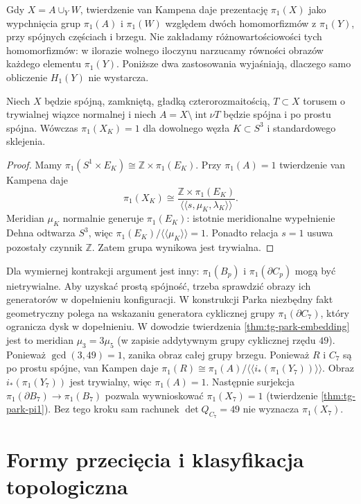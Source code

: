 Gdy $X=A\cup_Y W$, twierdzenie van Kampena daje prezentację
$\pi_1(X)$ jako wypchnięcia grup $\pi_1(A)$ i
$\pi_1(W)$ względem dwóch homomorfizmów
z $\pi_1(Y)$, przy spójnych częściach i brzegu.
Nie zakładamy różnowartościowości tych homomorfizmów:
w ilorazie wolnego iloczynu narzucamy równości
obrazów każdego elementu $\pi_1(Y)$. Poniższe dwa zastosowania
wyjaśniają, dlaczego samo obliczenie $H_1(Y)$ nie wystarcza.

\begin{stwierdzenie}
\label{prop:tg-syn-pi1}
Niech $X$ będzie spójną, zamkniętą, gładką czterorozmaitością,
$T\subset X$ torusem o trywialnej wiązce normalnej i niech
$A=X\setminus\operatorname{int}\nu T$ będzie spójna i po prostu
spójna. Wówczas $\pi_1(X_K)=1$ dla dowolnego węzła
$K\subset S^3$ i standardowego sklejenia.
\end{stwierdzenie}

\begin{proof}
Mamy $\pi_1(S^1\times E_K)\cong\mathbb Z\times\pi_1(E_K)$.
Przy $\pi_1(A)=1$ twierdzenie van Kampena daje
\[
 \pi_1(X_K)\cong
 \frac{\mathbb Z\times\pi_1(E_K)}
 {\langle\!\langle s,\mu_K,\lambda_K\rangle\!\rangle}.
\]
Meridian $\mu_K$ normalnie generuje $\pi_1(E_K)$: istotnie
meridionalne wypełnienie Dehna odtwarza $S^3$, więc
$\pi_1(E_K)/\langle\!\langle\mu_K\rangle\!\rangle=1$.
Ponadto relacja $s=1$ usuwa pozostały czynnik $\mathbb Z$.
Zatem grupa wynikowa jest trywialna.
\end{proof}

Dla wymiernej kontrakcji argument jest inny:
$\pi_1(B_p)$ i $\pi_1(\partial C_p)$ mogą być nietrywialne.
Aby uzyskać prostą spójność, trzeba sprawdzić obrazy ich
generatorów w dopełnieniu konfiguracji. W konstrukcji Parka
niezbędny fakt geometryczny polega na wskazaniu
generatora cyklicznej grupy $\pi_1(\partial C_7)$,
który ogranicza dysk w dopełnieniu.
W dowodzie twierdzenia \ref{thm:tg-park-embedding}
jest to meridian $\mu_3=3\mu_5$ (w zapisie
addytywnym grupy cyklicznej rzędu $49$).
Ponieważ $\gcd(3,49)=1$, zanika obraz całej grupy
brzegu. Ponieważ $R$ i $C_7$ są po prostu spójne,
van Kampen daje $\pi_1(R)\cong
\pi_1(A)/\langle\!\langle i_*(\pi_1(Y_7))\rangle\!\rangle$.
Obraz $i_*(\pi_1(Y_7))$ jest trywialny, więc
$\pi_1(A)=1$. Następnie surjekcja
$\pi_1(\partial B_7)\to\pi_1(B_7)$ pozwala
wywnioskować $\pi_1(X_7)=1$ (twierdzenie
\ref{thm:tg-park-pi1}). Bez tego
kroku sam rachunek $\det Q_{C_7}=49$ nie wyznacza
$\pi_1(X_7)$.

\section{Formy przecięcia i klasyfikacja topologiczna}
\label{sec:tg-syn-freedman}

